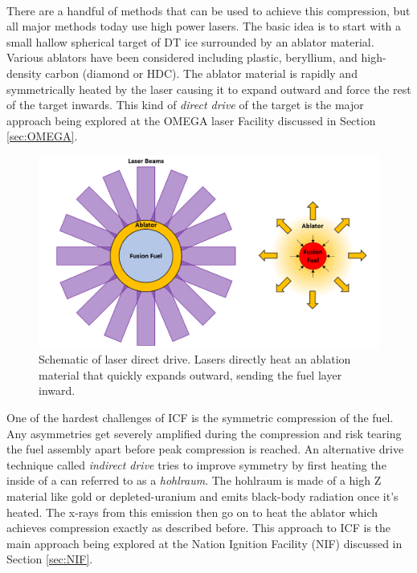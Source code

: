  \\

There are a handful of methods that can be used to achieve this compression, but all major methods today use high power lasers. The basic idea is to start with a small hallow spherical target of DT ice surrounded by an ablator material. Various ablators have been considered including plastic, beryllium, and high-density carbon (diamond or HDC). The ablator material is rapidly and symmetrically heated by the laser causing it to expand outward and force the rest of the target inwards. This kind of \emph{direct drive} of the target is the major approach being explored at the OMEGA laser Facility discussed in Section \ref{sec:OMEGA}. 

\begin{figure}[h!]
	\centering
	\includegraphics[scale=0.4]{Figures/directDrive.pdf}
	\caption[Direct Drive Schematic]{Schematic of laser direct drive. Lasers directly heat an ablation material that quickly expands outward, sending the fuel layer inward.  }
\end{figure}

One of the hardest challenges of ICF is the symmetric compression of the fuel. Any asymmetries get severely amplified during the compression and risk tearing the fuel assembly apart before peak compression is reached. An alternative drive technique called \emph{indirect drive} tries to improve symmetry by first heating the inside of a can referred to as a \emph{hohlraum}. The hohlraum is made of a high Z material like gold or depleted-uranium and emits black-body radiation once it's heated. The x-rays from this emission then go on to heat the ablator which achieves compression exactly as described before. This approach to ICF is the main approach being explored at the Nation Ignition Facility (NIF) discussed in Section \ref{sec:NIF}. 

